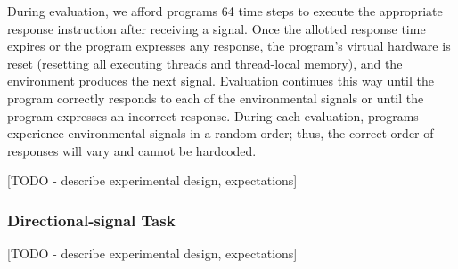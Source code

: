 During evaluation, we afford programs 64 time steps to execute the appropriate response instruction
after receiving a signal.
Once the allotted response time expires or the program expresses any response, the program's virtual
hardware is reset (resetting all executing threads and thread-local memory), and the environment produces
the next signal.
Evaluation continues this way until the program correctly responds to each of the environmental signals
or until the program expresses an incorrect response.
During each evaluation, programs experience environmental signals in a random order; thus, the correct
order of responses will vary and cannot be hardcoded.


[TODO - describe experimental design, expectations]


\subsubsection{Directional-signal Task}



[TODO - describe experimental design, expectations]